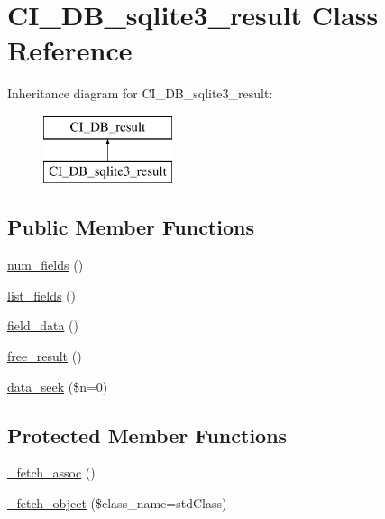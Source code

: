 \hypertarget{class_c_i___d_b__sqlite3__result}{}\section{C\+I\+\_\+\+D\+B\+\_\+sqlite3\+\_\+result Class Reference}
\label{class_c_i___d_b__sqlite3__result}
Inheritance diagram for C\+I\+\_\+\+D\+B\+\_\+sqlite3\+\_\+result\+:\begin{figure}[H]
\begin{center}
\leavevmode
\includegraphics[height=2.000000cm]{class_c_i___d_b__sqlite3__result}
\end{center}
\end{figure}
\subsection*{Public Member Functions}
\begin{DoxyCompactItemize}
\item 
\mbox{\hyperlink{class_c_i___d_b__sqlite3__result_a0640890d3b637272ef0301791f6c6907}{num\+\_\+fields}} ()
\item 
\mbox{\hyperlink{class_c_i___d_b__sqlite3__result_ad5f45fc14362f5bda78ca7770fb2d75f}{list\+\_\+fields}} ()
\item 
\mbox{\hyperlink{class_c_i___d_b__sqlite3__result_a0f8d669c6e719e475b3ff70972743528}{field\+\_\+data}} ()
\item 
\mbox{\hyperlink{class_c_i___d_b__sqlite3__result_ad0beede373ffbf778b8476e4f0121bd0}{free\+\_\+result}} ()
\item 
\mbox{\hyperlink{class_c_i___d_b__sqlite3__result_aa2f73ba8a0419edf298371afd94439fb}{data\+\_\+seek}} (\$n=0)
\end{DoxyCompactItemize}
\subsection*{Protected Member Functions}
\begin{DoxyCompactItemize}
\item 
\mbox{\hyperlink{class_c_i___d_b__sqlite3__result_aac60f117587d76d87add72efe41e8e97}{\+\_\+fetch\+\_\+assoc}} ()
\item 
\mbox{\hyperlink{class_c_i___d_b__sqlite3__result_ab6fb756a35637694893988eb48d8af15}{\+\_\+fetch\+\_\+object}} (\$class\+\_\+name=\textquotesingle{}std\+Class\textquotesingle{})
\end{DoxyCompactItemize}
